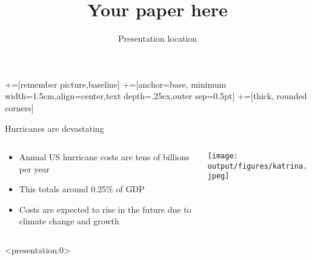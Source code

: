 \documentclass[handout,english,14pt,aspectratio=1610]{beamer}
\title{Your paper here}
\author[Names]{%
  \texorpdfstring{%
    \begin{columns}
      \column{.35\linewidth}
      \centering
      {Name} \\ \textcolor{hl}{Affil}
      \column{.35\linewidth}
      \centering
      {Name} \\ \textcolor{hl}{Affil}
    \end{columns}
 }
 {initials}
}
\date{Presentation location}
\begin{document}
\maketitle

\newcommand\tabnode[1]{\addtocounter{nodecount}{1} \tikz \node  (\arabic{nodecount}) {#1};}
+=[remember picture,baseline]
+=[anchor=base,
minimum width=1.5cm,align=center,text depth=.25ex,outer sep=0.5pt]
+=[thick, rounded corners]

\begin{frame}[c]{Hurricanes are devastating}
    \begin{columns}
        \begin{column}{0.55\textwidth}
           \begin{itemize} \itemsep 1em
               \item[] Annual US hurricane costs are tens of billions per year
               \item[] This totals around 0.25\% of GDP
               \item[] Costs are expected to rise in the future due to climate change and growth
           \end{itemize}
        \end{column}
        \begin{column}{0.55\textwidth}  %
            \begin{center}
                \texttt{[image: output/figures/katrina.jpeg]}
             \end{center}
        \end{column}
    \end{columns}
\end{frame}


\begin{frame}<presentation:0>
  \begin{singlespace}
    
    {}
    \end{singlespace}
\end{frame}
\end{document}
